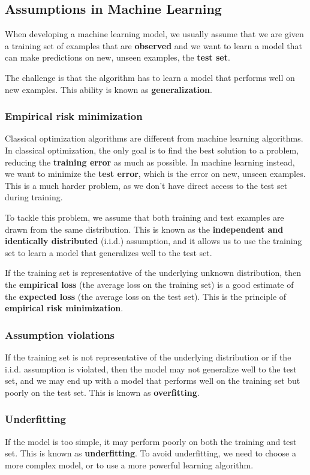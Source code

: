 \subsection{Assumptions in Machine Learning}
When developing a machine learning model, we usually assume that we are given a training set of examples that are \textbf{observed}
and we want to learn a model that can make predictions on new, unseen examples, the \textbf{test set}.

The challenge is that the algorithm has to learn a model that performs well on new examples. This ability is known as \textbf{generalization}.

\subsubsection{Empirical risk minimization}
Classical optimization algorithms are different from machine learning algorithms. 
In classical optimization, the only goal is to find the best solution to a problem, reducing the \textbf{training error} as much as possible.
In machine learning instead, we want to minimize the \textbf{test error}, which is the error on new, unseen examples. 
This is a much harder problem, as we don't have direct access to the test set during training.

To tackle this problem, we assume that both training and test examples are drawn from the same
distribution. This is known as the \textbf{independent and identically distributed} (i.i.d.) assumption, and it allows us to use the 
training set to learn a model that generalizes well to the test set.

If the training set is representative of the underlying unknown distribution, then the \textbf{empirical loss} (the average loss on the training set)
is a good estimate of the \textbf{expected loss} (the average loss on the test set). 
This is the principle of \textbf{empirical risk minimization}.

\subsubsection{Assumption violations}
If the training set is not representative of the underlying distribution or if the i.i.d. assumption is violated,
then the model may not generalize well to the test set, and we may end up with a model that performs well on the training set but poorly on the test set. This is known as \textbf{overfitting}.

\subsubsection{Underfitting}
If the model is too simple, it may perform poorly on both the training and test set. This is known as \textbf{underfitting}.
To avoid underfitting, we need to choose a more complex model, or to use a more powerful learning algorithm.

